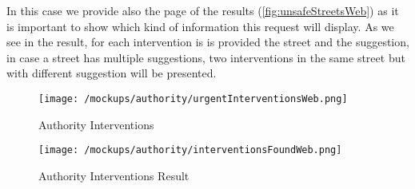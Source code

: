 				In this case we provide also the page of the results (\autoref{fig:unsafeStreetsWeb}) as it is important to show which kind of information this request will display. As we see in the result, for each intervention is is provided the street and the suggestion, in case a street has multiple suggestions, two interventions in the same street but with different suggestion will be presented.
				
				\vspace{0.4cm}				
				
				\begin{figure}[ht!]
					\centering
					\texttt{[image: /mockups/authority/urgentInterventionsWeb.png]}
					\caption{\label{fig:urgentInterventionsWeb} Authority Interventions}
				\end{figure}
			
				\begin{figure}[ht!]
					\centering
					\texttt{[image: /mockups/authority/interventionsFoundWeb.png]}
					\caption{\label{fig:interventionsFoundWeb} Authority Interventions Result}
				\end{figure}